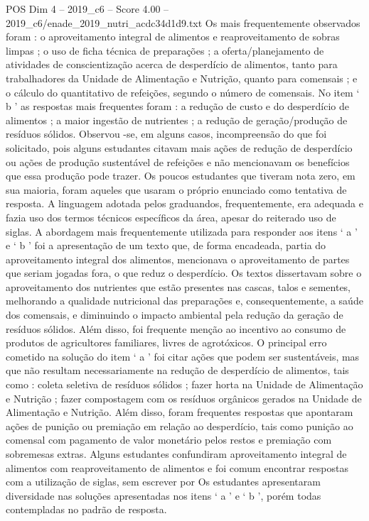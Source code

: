 \begin{textsample}{POS Dim 4 – 2019\_c6 – Score 4.00 – 2019\_c6/enade\_2019\_nutri\_acdc34d1d9.txt}
Os mais frequentemente observados foram : o aproveitamento integral de alimentos e reaproveitamento de sobras limpas ; o uso de ficha técnica de preparações ; a oferta/planejamento de atividades de conscientização acerca de desperdício de alimentos, tanto para trabalhadores da Unidade de Alimentação e Nutrição, quanto para comensais ; e o cálculo do quantitativo de refeições, segundo o número de comensais.
No item ‘ b ’ as respostas mais frequentes foram : a redução de custo e do desperdício de alimentos ; a maior ingestão de nutrientes ; a redução de geração/produção de resíduos sólidos.
Observou -se, em alguns casos, incompreensão do que foi solicitado, pois alguns estudantes citavam mais ações de redução de desperdício ou ações de produção sustentável de refeições e não mencionavam os benefícios que essa produção pode trazer.
Os poucos estudantes que tiveram nota zero, em sua maioria, foram aqueles que usaram o próprio enunciado como tentativa de resposta.
A linguagem adotada pelos graduandos, frequentemente, era adequada e fazia uso dos termos técnicos específicos da área, apesar do reiterado uso de siglas.
A abordagem mais frequentemente utilizada para responder aos itens ‘ a ’ e ‘ b ’ foi a apresentação de um texto que, de forma encadeada, partia do aproveitamento integral dos alimentos, mencionava o aproveitamento de partes que seriam jogadas fora, o que reduz o desperdício.
Os textos dissertavam sobre o aproveitamento dos nutrientes que estão presentes nas cascas, talos e sementes, melhorando a qualidade nutricional das preparações e, consequentemente, a saúde dos comensais, e diminuindo o impacto ambiental pela redução da geração de resíduos sólidos.
Além disso, foi frequente menção ao incentivo ao consumo de produtos de agricultores familiares, livres de agrotóxicos.
O principal erro cometido na solução do item ‘ a ’ foi citar ações que podem ser sustentáveis, mas que não resultam necessariamente na redução de desperdício de alimentos, tais como : coleta seletiva de resíduos sólidos ; fazer horta na Unidade de Alimentação e Nutrição ; fazer compostagem com os resíduos orgânicos gerados na Unidade de Alimentação e Nutrição.
Além disso, foram frequentes respostas que apontaram ações de punição ou premiação em relação ao desperdício, tais como punição ao comensal com pagamento de valor monetário pelos restos e premiação com sobremesas extras.
Alguns estudantes confundiram aproveitamento integral de alimentos com reaproveitamento de alimentos e foi comum encontrar respostas com a utilização de siglas, sem escrever por Os estudantes apresentaram diversidade nas soluções apresentadas nos itens ‘ a ’ e ‘ b ’, porém todas contempladas no padrão de resposta.

\end{textsample}
